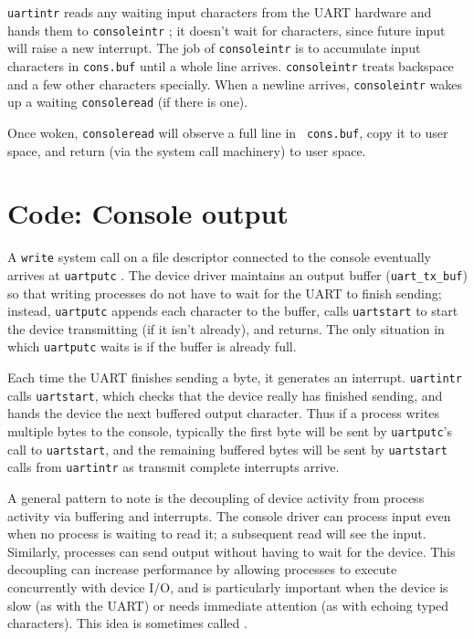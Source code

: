 {\tt uartintr}
reads any waiting input characters from the UART hardware
and hands them to {\tt consoleintr}
; it doesn't
wait for characters, since future input will raise a new interrupt.
The job of {\tt consoleintr} is to accumulate input characters in
{\tt cons.buf} 
until a whole line arrives.
{\tt consoleintr} treats backspace and a few other characters
specially.
When a newline arrives, {\tt consoleintr} wakes up a
waiting {\tt consoleread} (if there is one).

Once woken, {\tt consoleread} will observe a full line in {\tt
  cons.buf}, copy it to user space, and return (via the system call
machinery) to user space.

\section{Code: Console output}

A {\tt write} system call on a file descriptor connected to the console
eventually arrives at 
{\tt uartputc}
.
The device driver maintains an output buffer ({\tt uart\_tx\_buf})
so that writing processes do not have to wait for the UART to finish
sending; instead, {\tt uartputc} appends each character to the buffer,
calls {\tt uartstart} to start the device transmitting (if it isn't
already), and returns. The only situation in which {\tt uartputc}
waits is if the buffer is already full.

Each time the UART finishes sending a byte, it generates an interrupt.
{\tt uartintr} calls {\tt uartstart}, which checks that the device
really has finished sending, and hands the device the next buffered
output character. Thus if a process writes multiple bytes to the
console, typically the first byte will be sent by {\tt uartputc}'s
call to {\tt uartstart}, and the remaining buffered bytes will be sent
by {\tt uartstart} calls from {\tt uartintr} as transmit complete
interrupts arrive.

A general pattern to note is the decoupling of device activity from
process activity via buffering and interrupts. The console driver can
process input even when no process is waiting to read it; a subsequent
read will see the input. Similarly, processes can send output without
having to wait for the device. This decoupling can increase
performance by allowing processes to execute concurrently with device
I/O, and is particularly important when the device is slow (as with
the UART) or needs immediate attention (as with echoing typed
characters). This idea is sometimes called .

